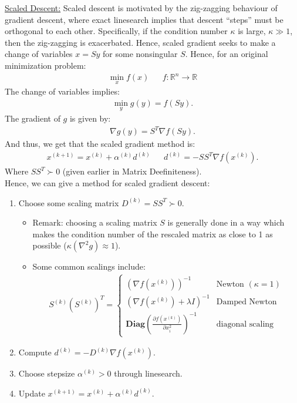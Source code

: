 \documentclass{article}
\newcommand{\sheader}[1]{\underline{#1:}}
\newcommand{\gap}{\medskip\\}
\begin{document}
\sheader{Scaled Descent} Scaled descent is motivated by the zig-zagging behaviour of gradient 
descent, where exact linesearch implies that descent ``steps'' must be orthogonal to each other.
Specifically, if the condition number $\kappa$ is large, $\kappa \gg 1$, then the zig-zagging is 
exacerbated. Hence, scaled gradient seeks to make a change of variables $x = Sy$ for some 
nonsingular $S$. Hence, for an original minimization problem:
\begin{align*}
    \min_{x}f(x) && f: \mathbb{R}^n \to \mathbb{R}
\end{align*}
The change of variables implies:
\begin{align*}
    \min_y g(y) = f(Sy).
\end{align*}
The gradient of $g$ is given by:
\begin{align*}
    \nabla g(y) = S^T\nabla f(Sy).
\end{align*}
And thus, we get that the scaled gradient method is:
\begin{align*}
    x^{(k + 1)} = x^{(k)} + \alpha^{(k)}d^{(k)} && d^{(k)} = -SS^T \nabla f(x^{(k)}).
\end{align*}
Where $SS^T \succ 0$ (given earlier in Matrix Deefiniteness).
\gap
Hence, we can give a method for scaled gradient descent:
\begin{enumerate}
    \item Choose some scaling matrix $D^{(k)} = SS^T \succ 0$.
    \begin{itemize}
        \item Remark: choosing a scaling matrix $S$ is generally done in a way which makes 
        the condition number of the rescaled matrix as close to 1 as possible ($\kappa(\nabla^2 g) \approx 1$).
        \item Some common scalings include:
        \begin{align*}
            S^{(k)} (S^{(k)})^T = \begin{cases}
                (\nabla f(x^{(k)}))^{-1} & \textrm{Newton } (\kappa = 1)\\
                (\nabla f(x^{(k)}) + \lambda I)^{-1} & \textrm{Damped Newton}\\
                \textbf{Diag}(\frac{\partial f(x^{(k)})}{\partial x_i^2})^{-1} & \textrm{diagonal scaling}
            \end{cases}
        \end{align*}
    \end{itemize}
    \item Compute $d^{(k)} = -D^{(k)}\nabla f(x^{(k)})$. 
    \item Choose stepsize $\alpha^{(k)} > 0$ through linesearch.
    \item Update $x^{(k + 1)} = x^{(k)} + \alpha^{(k)}d^{(k)}$.
\end{enumerate}
\end{document}
